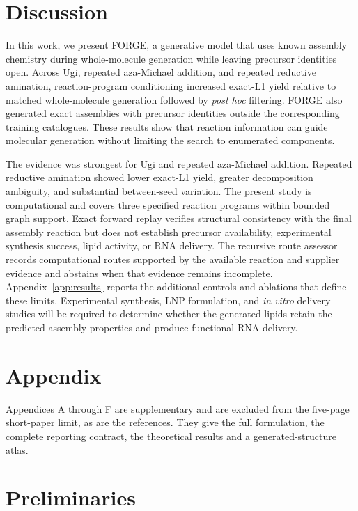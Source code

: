 \documentclass{article}
\begin{document}
\section{Discussion}

In this work, we present FORGE, a generative model that uses known assembly chemistry during whole-molecule generation while leaving precursor identities open. Across Ugi, repeated aza-Michael addition, and repeated reductive amination, reaction-program conditioning increased exact-L1 yield relative to matched whole-molecule generation followed by \textit{post hoc} filtering. FORGE also generated exact assemblies with precursor identities outside the corresponding training catalogues. These results show that reaction information can guide molecular generation without limiting the search to enumerated components.

The evidence was strongest for Ugi and repeated aza-Michael addition. Repeated reductive amination showed lower exact-L1 yield, greater decomposition ambiguity, and substantial between-seed variation. The present study is computational and covers three specified reaction programs within bounded graph support. Exact forward replay verifies structural consistency with the final assembly reaction but does not establish precursor availability, experimental synthesis success, lipid activity, or RNA delivery. The recursive route assessor records computational routes supported by the available reaction and supplier evidence and abstains when that evidence remains incomplete. Appendix~\ref{app:results} reports the additional controls and ablations that define these limits. Experimental synthesis, LNP formulation, and \textit{in vitro} delivery studies will be required to determine whether the generated lipids retain the predicted assembly properties and produce functional RNA delivery.





\clearpage
\appendix

\section*{Appendix}

Appendices A through F are supplementary and are excluded from the five-page short-paper limit, as
are the references. They give the full formulation, the complete reporting contract, the theoretical
results and a generated-structure atlas.

\section{Preliminaries}
\label{app:preliminaries}
\end{document}
